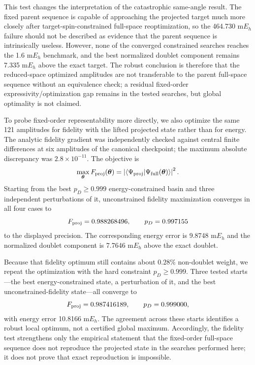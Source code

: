 \documentclass[
 aip,
 jcp,
 amsmath,amssymb,
 preprint
]{revtex4-2}
\begin{document}
This test changes the interpretation of the catastrophic same-angle result.
The fixed parent sequence is capable of approaching the projected target much more closely after target-spin-constrained full-space reoptimization, so the 464.730 m$E_h$ failure should not be described as evidence that the parent sequence is intrinsically useless.
However, none of the converged constrained searches reaches the 1.6 m$E_h$ benchmark, and the best normalized doublet component remains 7.335 m$E_h$ above the exact target.
The robust conclusion is therefore that the reduced-space optimized amplitudes are not transferable to the parent full-space sequence without an equivalence check; a residual fixed-order expressivity/optimization gap remains in the tested searches, but global optimality is not claimed.

To probe fixed-order representability more directly, we also optimize the same 121 amplitudes for fidelity with the lifted projected state rather than for energy.
The analytic fidelity gradient was independently checked against central finite differences at six amplitudes of the canonical checkpoint; the maximum absolute discrepancy was $2.8\times10^{-11}$.
The objective is
\begin{equation}
\max_{\boldsymbol\theta}
F_{\rm proj}(\boldsymbol\theta)
=
\left|
\langle\Psi_{\rm proj}|\Psi_{\rm full}(\boldsymbol\theta)\rangle
\right|^2 .
\end{equation}
Starting from the best $p_D\ge0.999$ energy-constrained basin and three independent perturbations of it, unconstrained fidelity maximization converges in all four cases to
\begin{equation}
F_{\rm proj}=0.988268496,\qquad p_D=0.997155
\end{equation}
to the displayed precision.
The corresponding energy error is 9.8748 m$E_h$ and the normalized doublet component is 7.7646 m$E_h$ above the exact doublet.

Because that fidelity optimum still contains about $0.28\%$ non-doublet weight, we repeat the optimization with the hard constraint $p_D\ge0.999$.
Three tested starts---the best energy-constrained state, a perturbation of it, and the best unconstrained-fidelity state---all converge to
\begin{equation}
F_{\rm proj}=0.987416189,\qquad p_D=0.999000,
\end{equation}
with energy error 10.8166 m$E_h$.
The agreement across these starts identifies a robust local optimum, not a certified global maximum.
Accordingly, the fidelity test strengthens only the empirical statement that the fixed-order full-space sequence does not reproduce the projected state in the searches performed here; it does not prove that exact reproduction is impossible.
\end{document}
